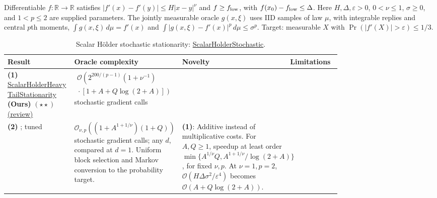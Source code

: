 \begin{table}[tp]
\centering
\caption{Scalar H\"older stochastic stationarity: \href{https://github.com/k3nfalt/longtails/blob/main/LongTails/Setups/ScalarHolderStochastic.lean}{ScalarHolderStochastic}.}\label{tab:ScalarHolderStochastic}
\parbox{\linewidth}{\footnotesize Differentiable $f:\mathbb R\to\mathbb R$ satisfies $|f'(x)-f'(y)|\le H|x-y|^\nu$ and $f\ge f_{\rm low}$, with $f(x_0)-f_{\rm low}\le\Delta$. Here $H,\Delta,\varepsilon>0$, $0<\nu\le1$, $\sigma\ge0$, and $1<p\le2$ are supplied parameters. The jointly measurable oracle $g(x,\xi)$ uses IID samples of law $\mu$, with integrable replies and central $p$th moments, $\int g(x,\xi)\,d\mu=f'(x)$ and $\int|g(x,\xi)-f'(x)|^p\,d\mu\le\sigma^p$. Target: measurable $X$ with $\Pr(|f'(X)|>\varepsilon)\le1/3$.}\par\smallskip
\begin{threeparttable}
\footnotesize
\setlength{\tabcolsep}{4pt}\renewcommand{\arraystretch}{1.25}
\begin{tabularx}{\linewidth}{@{}>{\raggedright\arraybackslash}p{0.20\linewidth}>{\raggedright\arraybackslash}p{0.32\linewidth}>{\raggedright\arraybackslash}p{0.25\linewidth}>{\raggedright\arraybackslash}X@{}}
\toprule
\textbf{Result} & \textbf{Oracle complexity} & \textbf{Novelty} & \textbf{Limitations} \\
\midrule
\textbf{(1)} \href{https://github.com/k3nfalt/longtails/blob/main/LongTails/Theorems/ScalarHolderHeavyTailStationarity.lean}{Scalar\allowbreak Holder\allowbreak Heavy\allowbreak Tail\allowbreak Stationarity} \textbf{(Ours)} $(\star\star)$ \href{https://github.com/k3nfalt/longtails/blob/main/scripts/reviews/ScalarHolderHeavyTailStationarity.md}{(review)}
& $\begin{gathered}\mathcal{O}\!\left(2^{200/(p-1)}(1+\nu^{-1})\right.\\[-2pt]\left.{}\cdot[1+A+Q\log(2+A)]\right)\end{gathered}$ stochastic gradient calls & & \\
\midrule[1.2pt]
\textbf{(2)} \citep[Cor.~11, full version]{shsLiu2025v1}; tuned
& $\mathcal{O}_{\nu,p}\!\left((1+A^{1+1/\nu})(1+Q)\right)$ stochastic gradient calls; any $d$, compared at $d=1$. Uniform block selection and Markov conversion to the probability target.
& \textbf{(1)}: Additive instead of multiplicative costs. For $A,Q\ge1$, speedup at least order $\min\{A^{1/\nu}Q,A^{1+1/\nu}/\log(2+A)\}$, for fixed $\nu,p$. At $\nu=1,p=2$, $\mathcal{O}(H\Delta\sigma^2/\varepsilon^4)$ becomes $\mathcal{O}(A+Q\log(2+A))$.

\end{tabularx}
\end{threeparttable}
\end{table}
